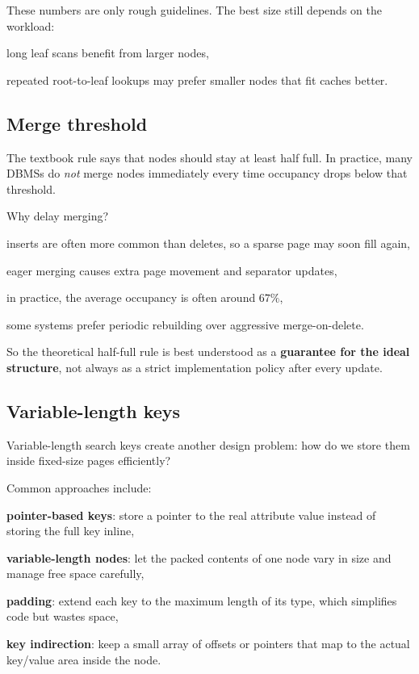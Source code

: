 \documentclass[../../dis.tex]{subfiles}
\begin{document}
These numbers are only rough guidelines. The best size still depends on the workload:
\begin{dashlist}
    \item long leaf scans benefit from larger nodes,
    \item repeated root-to-leaf lookups may prefer smaller nodes that fit caches better.
\end{dashlist}

\subsection{Merge threshold}
The textbook rule says that nodes should stay at least half full. In practice, many DBMSs do \emph{not} merge nodes immediately every time occupancy drops below that threshold.

Why delay merging?
\begin{dashlist}
    \item inserts are often more common than deletes, so a sparse page may soon fill again,
    \item eager merging causes extra page movement and separator updates,
    \item in practice, the average occupancy is often around \(67\%\),
    \item some systems prefer periodic rebuilding over aggressive merge-on-delete.
\end{dashlist}

So the theoretical half-full rule is best understood as a \textbf{guarantee for the ideal structure}, not always as a strict implementation policy after every update.

\subsection{Variable-length keys}
Variable-length search keys create another design problem: how do we store them inside fixed-size pages efficiently?

Common approaches include:
\begin{dashlist}
    \item \textbf{pointer-based keys}: store a pointer to the real attribute value instead of storing the full key inline,
    \item \textbf{variable-length nodes}: let the packed contents of one node vary in size and manage free space carefully,
    \item \textbf{padding}: extend each key to the maximum length of its type, which simplifies code but wastes space,
    \item \textbf{key indirection}: keep a small array of offsets or pointers that map to the actual key/value area inside the node.
\end{dashlist}
\end{document}
